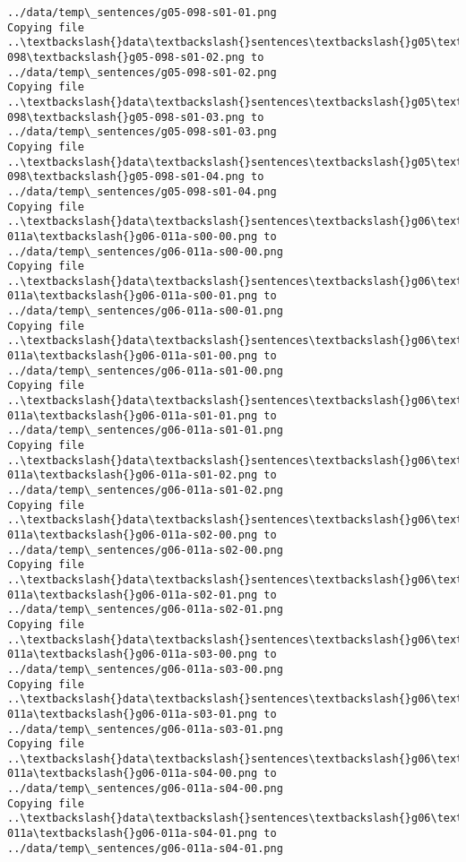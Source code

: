 \documentclass[11pt]{article}
\begin{document}
\begin{Verbatim}[commandchars=\\\{\}]
../data/temp\_sentences/g05-098-s01-01.png
Copying file ..\textbackslash{}data\textbackslash{}sentences\textbackslash{}g05\textbackslash{}g05-098\textbackslash{}g05-098-s01-02.png to
../data/temp\_sentences/g05-098-s01-02.png
Copying file ..\textbackslash{}data\textbackslash{}sentences\textbackslash{}g05\textbackslash{}g05-098\textbackslash{}g05-098-s01-03.png to
../data/temp\_sentences/g05-098-s01-03.png
Copying file ..\textbackslash{}data\textbackslash{}sentences\textbackslash{}g05\textbackslash{}g05-098\textbackslash{}g05-098-s01-04.png to
../data/temp\_sentences/g05-098-s01-04.png
Copying file ..\textbackslash{}data\textbackslash{}sentences\textbackslash{}g06\textbackslash{}g06-011a\textbackslash{}g06-011a-s00-00.png to
../data/temp\_sentences/g06-011a-s00-00.png
Copying file ..\textbackslash{}data\textbackslash{}sentences\textbackslash{}g06\textbackslash{}g06-011a\textbackslash{}g06-011a-s00-01.png to
../data/temp\_sentences/g06-011a-s00-01.png
Copying file ..\textbackslash{}data\textbackslash{}sentences\textbackslash{}g06\textbackslash{}g06-011a\textbackslash{}g06-011a-s01-00.png to
../data/temp\_sentences/g06-011a-s01-00.png
Copying file ..\textbackslash{}data\textbackslash{}sentences\textbackslash{}g06\textbackslash{}g06-011a\textbackslash{}g06-011a-s01-01.png to
../data/temp\_sentences/g06-011a-s01-01.png
Copying file ..\textbackslash{}data\textbackslash{}sentences\textbackslash{}g06\textbackslash{}g06-011a\textbackslash{}g06-011a-s01-02.png to
../data/temp\_sentences/g06-011a-s01-02.png
Copying file ..\textbackslash{}data\textbackslash{}sentences\textbackslash{}g06\textbackslash{}g06-011a\textbackslash{}g06-011a-s02-00.png to
../data/temp\_sentences/g06-011a-s02-00.png
Copying file ..\textbackslash{}data\textbackslash{}sentences\textbackslash{}g06\textbackslash{}g06-011a\textbackslash{}g06-011a-s02-01.png to
../data/temp\_sentences/g06-011a-s02-01.png
Copying file ..\textbackslash{}data\textbackslash{}sentences\textbackslash{}g06\textbackslash{}g06-011a\textbackslash{}g06-011a-s03-00.png to
../data/temp\_sentences/g06-011a-s03-00.png
Copying file ..\textbackslash{}data\textbackslash{}sentences\textbackslash{}g06\textbackslash{}g06-011a\textbackslash{}g06-011a-s03-01.png to
../data/temp\_sentences/g06-011a-s03-01.png
Copying file ..\textbackslash{}data\textbackslash{}sentences\textbackslash{}g06\textbackslash{}g06-011a\textbackslash{}g06-011a-s04-00.png to
../data/temp\_sentences/g06-011a-s04-00.png
Copying file ..\textbackslash{}data\textbackslash{}sentences\textbackslash{}g06\textbackslash{}g06-011a\textbackslash{}g06-011a-s04-01.png to
../data/temp\_sentences/g06-011a-s04-01.png

\end{Verbatim}
\end{document}
